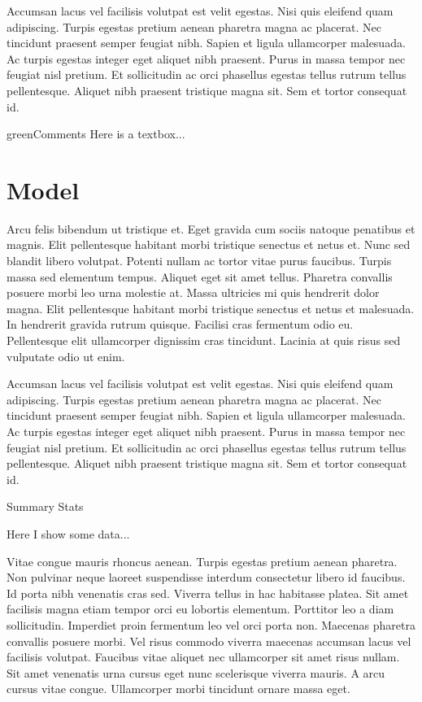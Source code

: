 Accumsan lacus vel facilisis volutpat est velit egestas. Nisi quis eleifend
quam adipiscing. Turpis egestas pretium aenean pharetra magna ac placerat.
Nec tincidunt praesent semper feugiat nibh. Sapien et ligula ullamcorper
malesuada. Ac turpis egestas integer eget aliquet nibh praesent. Purus in
massa tempor nec feugiat nisl pretium. Et sollicitudin ac orci phasellus
egestas tellus rutrum tellus pellentesque. Aliquet nibh praesent tristique
magna sit. Sem et tortor consequat id.


\begin{textbox}{green}{Comments}
Here is a textbox...
\end{textbox}

\section{Model}

Arcu felis bibendum ut tristique et. Eget gravida cum sociis natoque penatibus
et magnis. Elit pellentesque habitant morbi tristique senectus et netus et.
Nunc sed blandit libero volutpat. Potenti nullam ac tortor vitae purus
faucibus. Turpis massa sed elementum tempus. Aliquet eget sit amet tellus.
Pharetra convallis posuere morbi leo urna molestie at. Massa ultricies mi
quis hendrerit dolor magna. Elit pellentesque habitant morbi tristique
senectus et netus et malesuada. In hendrerit gravida rutrum quisque. Facilisi
cras fermentum odio eu. Pellentesque elit ullamcorper dignissim cras
tincidunt. Lacinia at quis risus sed vulputate odio ut enim. 

Accumsan lacus vel facilisis volutpat est velit egestas. Nisi quis eleifend
quam adipiscing. Turpis egestas pretium aenean pharetra magna ac placerat.
Nec tincidunt praesent semper feugiat nibh. Sapien et ligula ullamcorper
malesuada. Ac turpis egestas integer eget aliquet nibh praesent. Purus in
massa tempor nec feugiat nisl pretium. Et sollicitudin ac orci phasellus
egestas tellus rutrum tellus pellentesque. Aliquet nibh praesent tristique
magna sit. Sem et tortor consequat id.

\begin{table}
\caption{Summary Stats}
\centering

\caption*{
  Here I show some data...
}
\label{table:example_table.tex}
\end{table}

Vitae congue mauris rhoncus aenean. Turpis egestas pretium aenean pharetra.
Non pulvinar neque laoreet suspendisse interdum consectetur libero id
faucibus. Id porta nibh venenatis cras sed. Viverra tellus in hac habitasse
platea. Sit amet facilisis magna etiam tempor orci eu lobortis elementum.
Porttitor leo a diam sollicitudin. Imperdiet proin fermentum leo vel orci
porta non. Maecenas pharetra convallis posuere morbi. Vel risus commodo
viverra maecenas accumsan lacus vel facilisis volutpat. Faucibus vitae
aliquet nec ullamcorper sit amet risus nullam. Sit amet venenatis urna cursus
eget nunc scelerisque viverra mauris. A arcu cursus vitae congue. Ullamcorper
morbi tincidunt ornare massa eget.

